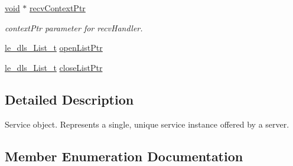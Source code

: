 \begin{DoxyCompactItemize}
\hyperlink{_t_e_m_p_l_a_t_e__cdef_8h_ac9c84fa68bbad002983e35ce3663c686}{void} $\ast$ \hyperlink{structmsg_interface___service__t_a2fb47f59f32f15485514d79ed8b748a6}{recv\+Context\+Ptr}
\begin{DoxyCompactList}\small\item\em context\+Ptr parameter for recv\+Handler. \end{DoxyCompactList}\item 
\hyperlink{structle__dls___list__t}{le\+\_\+dls\+\_\+\+List\+\_\+t} \hyperlink{structmsg_interface___service__t_a1ad3d18bbf1ba2d6a3fcdabb199951e0}{open\+List\+Ptr}
\item 
\hyperlink{structle__dls___list__t}{le\+\_\+dls\+\_\+\+List\+\_\+t} \hyperlink{structmsg_interface___service__t_adb16893a8279a37a024a9b74d5263977}{close\+List\+Ptr}
\end{DoxyCompactItemize}


\subsection{Detailed Description}
Service object. Represents a single, unique service instance offered by a server. 

\subsection{Member Enumeration Documentation}
